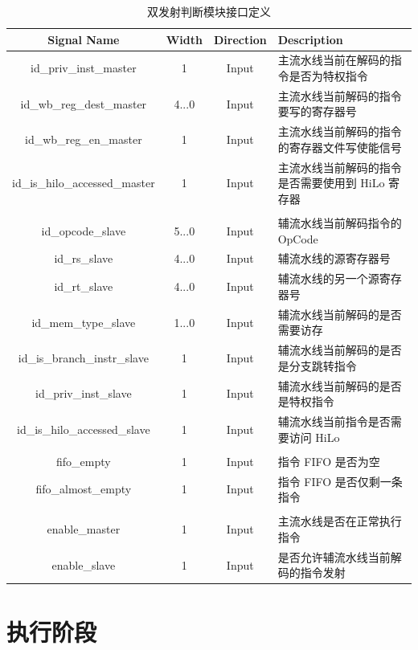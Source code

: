 \documentclass[blue,normal,cn,hide]{elegantbook}
\begin{document}
\begin{table}
    \renewcommand\arraystretch{1.25}
    \centering
    \begin{tabular}{cccm{}}
        \toprule 
        \rowcolor{black!20} \textbf{Signal Name} & \textbf{Width} & \textbf{Direction} & \textbf{Description} \\
        \midrule
        id\_priv\_inst\_master & 1 & Input & 主流水线当前在解码的指令是否为特权指令\\
        id\_wb\_reg\_dest\_master & 4...0 & Input & 主流水线当前解码的指令要写的寄存器号\\
        id\_wb\_reg\_en\_master & 1 & Input & 主流水线当前解码的指令的寄存器文件写使能信号\\
        id\_is\_hilo\_accessed\_master & 1 & Input & 主流水线当前解码的指令是否需要使用到 HiLo 寄存器\\
        \\
        id\_opcode\_slave & 5...0 & Input & 辅流水线当前解码指令的 OpCode\\
        id\_rs\_slave & 4...0 & Input & 辅流水线的源寄存器号\\
        id\_rt\_slave & 4...0 & Input & 辅流水线的另一个源寄存器号\\
        id\_mem\_type\_slave & 1...0 & Input & 辅流水线当前解码的是否需要访存\\
        id\_is\_branch\_instr\_slave & 1 & Input & 辅流水线当前解码的是否是分支跳转指令\\
        id\_priv\_inst\_slave & 1 & Input & 辅流水线当前解码的是否是特权指令\\
        id\_is\_hilo\_accessed\_slave & 1 & Input & 辅流水线当前指令是否需要访问 HiLo\\
        \\
        fifo\_empty & 1 & Input & 指令 FIFO 是否为空\\
        fifo\_almost\_empty & 1 & Input & 指令 FIFO 是否仅剩一条指令\\
        \\
        enable\_master & 1 & Input & 主流水线是否在正常执行指令\\
        enable\_slave & 1 & Input & 是否允许辅流水线当前解码的指令发射\\
        \bottomrule
    \end{tabular}
    \caption{双发射判断模块接口定义}
    \label{tab:DualIssueInterface}
\end{table}

\section{执行阶段}
\end{document}
